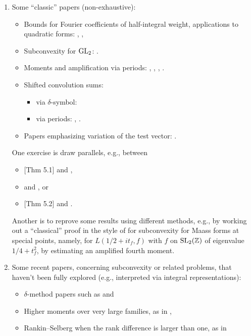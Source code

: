 \documentclass[reqno]{amsart} 
\begin{document}
\begin{enumerate}
\item Some ``classic'' papers (non-exhaustive):
  \begin{itemize}
  \item Bounds for Fourier coefficients of half-integral weight, applications to quadratic forms: \cite{MR870736}, \cite{MR931205}, \cite{MR1437494}
  \item Subconvexity for $\operatorname{GL}_2$: \cite{DFI93} \cite{DFI94} \cite{DFI01}.
  \item Moments and amplification via periods:  \cite{venkatesh-2005}, \cite{michel-2009}, \cite{iwan-sar}, \cite{MR780071}.
  \item Shifted convolution sums:
    \begin{itemize}
    \item via $\delta$-symbol: \cite{DFI93}
    \item via periods: \cite{Sar01}\cite{MR2437682}, \cite{2024arXiv2404.10692}.
    \end{itemize}
  \item Papers emphasizing variation of the test vector:   \cite{MR2373356, MR2726097, venkatesh-2005}.
  \end{itemize}
  One exercise is draw parallels, e.g., between
  \begin{itemize}
  \item \cite{michel-2009}[Thm 5.1] and \cite{DFI93},
  \item \cite[\S4]{venkatesh-2005} and \cite{DFI94}, or
  \item \cite{michel-2009}[Thm 5.2] and \cite{DFI01}.
  \end{itemize}
  Another is to reprove some results using different methods, e.g., by working out a ``classical'' proof in the style of \cite{DFI01} for subconvexity for Maass forms at special points, namely, for $L(1/2 + i t_f, f)$ with $f$ on $\operatorname{SL}_2(\mathbb{Z})$ of eigenvalue $1/4 + t_f^2$, by estimating an amplified fourth moment.
  
\item Some recent papers, concerning subconvexity or related problems, that haven't been fully explored (e.g., interpreted via integral representations):
  \begin{itemize}
  \item $\delta$-method papers such as \cite{MR4416133} and \cite{2022arXiv2206.06517}
  \item Higher moments over very large families, as in \cite{MR4216694}, \cite{MR4067357}
  \item Rankin--Selberg when the rank difference is larger than one, as in \cite{MR3996341}
  \end{itemize}


\end{enumerate}
\end{document}
